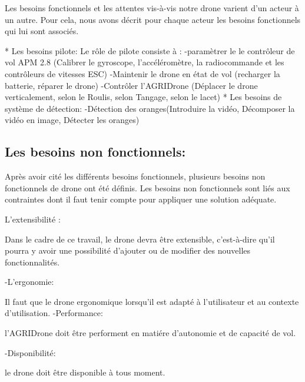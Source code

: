 		Les besoins fonctionnels et les attentes vis-à-vis notre drone varient d'un acteur à un autre. 
		Pour cela, nous avons décrit pour chaque acteur les besoins fonctionnels qui lui sont associés.
		
		* Les besoins pilote:
		Le rôle de pilote consiste à :
		-paramètrer le le contrôleur de vol APM 2.8 (Calibrer le gyroscope, l'accéléromètre, la radiocommande et les contrôleurs de vitesses ESC)
		-Maintenir le drone en état de vol (recharger la batterie, réparer le drone)
		-Contrôler l'AGRIDrone (Déplacer le drone verticalement, selon le Roulis, selon Tangage, selon le lacet)
		* Les besoins de système de détection:
		-Détection des oranges(Introduire la vidéo, Décomposer la vidéo en image, Détecter les oranges)
		\subsection{Les besoins non fonctionnels:}
		Après avoir cité les différents besoins fonctionnels, plusieurs besoins non fonctionnels de drone ont été définis.
		Les besoins non fonctionnels sont liés aux contraintes dont il faut tenir compte pour appliquer une solution adéquate.
		
		L'extensibilité :
		\par
		Dans le cadre de ce travail, le drone devra être extensible, c'est-à-dire qu'il pourra y avoir une possibilité d'ajouter ou de modifier des nouvelles fonctionnalités.
		
		-L'ergonomie: 
		\par
		Il faut que le drone ergonomique lorsqu'il est adapté à l'utilisateur et au contexte 
		d'utilisation.
		\newpage
		-Performance: 
		\par
		l'AGRIDrone doit être performent en matiére d'autonomie et de capacité de vol.
		
		-Disponibilité:
		\par
		le drone doit être disponible à tous moment.
	

